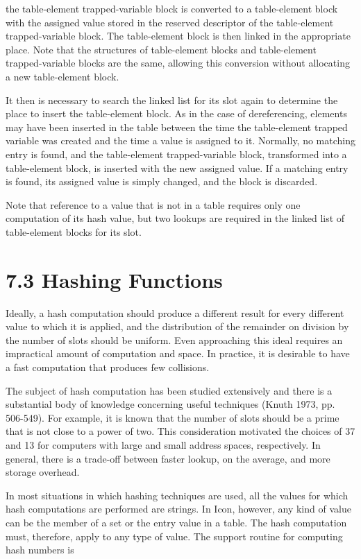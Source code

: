 \noindent the table-element trapped-variable block is converted to a
table-element block with the assigned value stored in the reserved
descriptor of the table-element trapped-variable block. The
table-element block is then linked in the appropriate place. Note that
the structures of table-element blocks and table-element
trapped-variable blocks are the same, allowing this conversion without
allocating a new table-element block.

It then is necessary to search the linked list for its slot again to
determine the place to insert the table-element block. As in the case
of dereferencing, elements may have been inserted in the table between
the time the table-element trapped variable was created and the time a
value is assigned to it. Normally, no matching entry is found, and the
table-element trapped-variable block, transformed into a table-element
block, is inserted with the new assigned value.  If a matching entry
is found, its assigned value is simply changed, and the block is
discarded.

Note that reference to a value that is not in a table requires only
one computation of its hash value, but two lookups are required in the
linked list of table-element blocks for its slot.


\section[7.3 Hashing Functions]{7.3 Hashing Functions}

Ideally, a hash computation should produce a different result for
every different value to which it is applied, and the distribution of
the remainder on division by the number of slots should be
uniform. Even approaching this ideal requires an impractical amount of
computation and space. In practice, it is desirable to have a fast
computation that produces few collisions.

The subject of hash computation has been studied extensively and there
is a substantial body of knowledge concerning useful techniques (Knuth
1973, pp. 506-549). For example, it is known that the number of slots
should be a prime that is not close to a power of two. This
consideration motivated the choices of 37 and 13 for computers with
large and small address spaces, respectively. In general, there is a
trade-off between faster lookup, on the average, and more storage
overhead.

In most situations in which hashing techniques are used, all the
values for which hash computations are performed are strings. In Icon,
however, any kind of value can be the member of a set or the entry
value in a table. The hash computation must, therefore, apply to any
type of value. The support routine for computing hash numbers is


